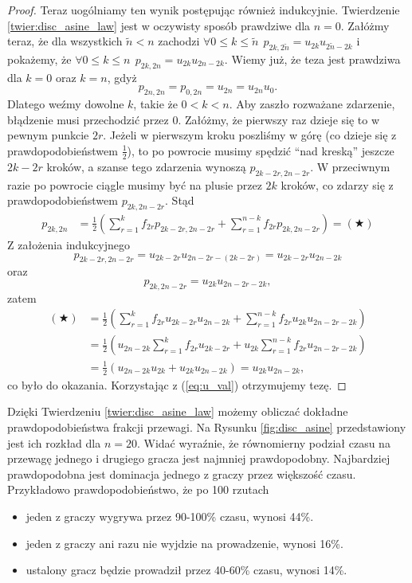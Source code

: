 \documentclass[a4paper,11pt,oneside]{book}
\theoremstyle{definition}
\begin{document}
\begin{proof}
Teraz uogólniamy ten wynik postępując również indukcyjnie. Twierdzenie \ref{twier:disc_asine_law} jest w oczywisty sposób prawdziwe dla $n=0$. Załóżmy teraz, że dla wszystkich $\tilde{n} < n$ zachodzi $\forall 0 \leq k \leq \tilde{n}\ \ p_{2k,2\tilde{n}} = u_{2k} u_{2\tilde{n}-2k}$ i pokażemy, że $\forall 0 \leq k \leq n\ \ p_{2k,2n} = u_{2k} u_{2n-2k}$. 
Wiemy już, że teza jest prawdziwa dla $k = 0$ oraz $k = n$, gdyż
\[  p_{2n,2n} = p_{0,2n} = u_{2n} = u_{2n}u_0. \]
Dlatego weźmy dowolne $k$, takie że $0 < k < n$. Aby zaszło rozważane zdarzenie, błądzenie musi przechodzić przez 0. Załóżmy, że pierwszy raz dzieje się to w pewnym punkcie $2r$. Jeżeli w pierwszym kroku poszliśmy w górę (co dzieje się z prawdopodobieństwem $\frac{1}{2}$), to po powrocie musimy spędzić ``nad kreską'' jeszcze $2k-2r$ kroków, a szanse tego zdarzenia wynoszą $p_{2k-2r, 2n-2r}$. W przeciwnym razie po powrocie ciągle musimy być na plusie przez $2k$ kroków, co zdarzy się z prawdopodobieństwem $p_{2k,2n-2r}$. Stąd
\begin{equation*}
 \begin{split}
  p_{2k,2n} &= \frac{1}{2} \left( \sum_{r=1}^k f_{2r} p_{2k-2r,2n-2r} + \sum_{r=1}^{n-k} f_{2r} p_{2k, 2n-2r} \right) = (\bigstar)
 \end{split}
\end{equation*}
\noindent Z założenia indukcyjnego
\[ p_{2k-2r,2n-2r} = u_{2k-2r}u_{2n-2r - (2k-2r)} = u_{2k-2r}u_{2n-2k} \]
oraz
\[ p_{2k,2n-2r} = u_{2k}u_{2n-2r-2k}, \]
zatem
\begin{equation*}
 \begin{split}
  (\bigstar) &= \frac{1}{2} \left( \sum_{r=1}^k f_{2r} u_{2k-2r}u_{2n-2k} + \sum_{r=1}^{n-k} f_{2r} u_{2k}u_{2n-2r-2k} \right) \\
             &= \frac{1}{2} \left( u_{2n-2k}\sum_{r=1}^k f_{2r} u_{2k-2r} + u_{2k}\sum_{r=1}^{n-k} f_{2r} u_{2n-2r-2k} \right) \\
             &= \frac{1}{2} \left( u_{2n-2k}u_{2k} + u_{2k} u_{2n-2k} \right) = u_{2k} u_{2n-2k},
 \end{split}
\end{equation*}
co było do okazania. Korzystając z (\ref{eq:u_val}) otrzymujemy tezę.
\end{proof}

Dzięki Twierdzeniu \ref{twier:disc_asine_law} możemy obliczać dokładne prawdopodobieństwa frakcji przewagi. Na Rysunku \ref{fig:disc_asine} przedstawiony jest ich rozkład dla $n=20$. Widać wyraźnie, że równomierny podział czasu na przewagę jednego i drugiego gracza jest najmniej prawdopodobny. Najbardziej prawdopodobna jest dominacja jednego z graczy przez większość czasu. Przykładowo prawdopodobieństwo, że po 100 rzutach
\begin{itemize}
 \item jeden z graczy wygrywa przez 90-100\% czasu, wynosi 44\%.
 \item jeden z graczy ani razu nie wyjdzie na prowadzenie, wynosi 16\%.
 \item ustalony gracz będzie prowadził przez 40-60\% czasu, wynosi 14\%.
\end{itemize}
\end{document}

